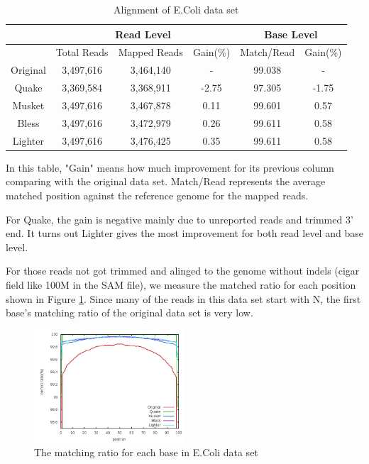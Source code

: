 \documentclass[10pt]{article}
\begin{document}
\begin{table}
\begin{tabular}{|c|c|c|c||c|c|} \hline
	 & \multicolumn{3}{|c||}{Read Level} & \multicolumn{2}{|c|}{Base Level} \\ \hline
     & Total Reads 	& Mapped Reads & Gain(\%) & Match/Read & Gain(\%) \\ \hline
Original & 3,497,616 & 	3,464,140	 & - & 99.038	& - \\ \hline
Quake	& 3,369,584	& 3,368,911	& -2.75	& 97.305	& -1.75  \\ \hline
Musket	& 3,497,616	& 3,467,878	& 0.11	& 99.601	& 0.57  \\ \hline
Bless	& 3,497,616	& 3,472,979	& 0.26	& 99.611	& 0.58  \\ \hline
Lighter	 & 3,497,616	&  3,476,425	& 0.35	& 99.611	& 0.58  \\ \hline

\end{tabular}
\caption{Alignment of E.Coli data set\label{table:ecoli_alignment}}
\end{table}

In this table, "Gain" means how much improvement for its previous column comparing with the original data set. Match/Read represents the average matched position against the reference genome for the mapped reads.

For Quake, the gain is negative mainly due to unreported reads and trimmed 3' end. It turns out Lighter gives the most improvement for both read level and base level.

For those reads not got trimmed and alinged to the genome without indels (cigar field like 100M in the SAM file), we measure the matched ratio for each position shown in Figure \ref{fig:ecoli_perbase}. Since many of the reads in this data set start with N, the first base's matching ratio of the original data set is very low. 

\begin{figure}[h!]
\begin{center}
\includegraphics[width=0.5\textwidth]{per_base.jpg}
\caption{The matching ratio for each base in E.Coli data set\label{fig:ecoli_perbase}}
\end{center}
\end{figure}
\end{document}
